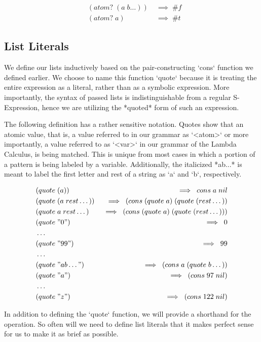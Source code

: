 \begin{align*}
& (atom? \; (a \; b\dots)) \; &\implies \; \#f
\\& (atom? \; a) \; &\implies \; \#t
\end{align*}

\subsection{List Literals}
We define our lists inductively based on the pair-constructing `cons` function we 
defined earlier. We choose to name this function `quote` because it is treating 
the entire expression as a literal, rather than as a symbolic expression. More 
importantly, the syntax of passed lists is indistinguishable from a regular 
S-Expression, hence we are utilizing the *quoted* form of such an expression.

The following definition has a rather sensitive notation. Quotes show that an 
atomic value, that is, a value referred to in our grammar as `<atom>` or more 
importantly, a value referred to as `<var>` in our grammar of the Lambda Calculus, 
is being matched. This is unique from most cases in which a portion of a pattern 
is being labeled by a variable. Additionally, the italicized *ab...* is meant to 
label the first letter and rest of a string as `a` and `b`, respectively.

\begin{align*}
& (quote \; (a)) \; &\implies \; cons \; a \; nil
\\& (quote \; (a \; rest\dots)) \; &\implies \; (cons \; (quote \; a) \; (quote \; (rest\dots))
\\& (quote \; a \; rest\dots) \; &\implies \; (cons \; (quote \; a) \; (quote \; (rest\dots)))
\\& (quote \; "0") \; &\implies \; 0
\\& \dots
\\& (quote \; "99") \; &\implies \; 99
\\& \dots
\\& (quote \; "ab\dots") \; &\implies \; (cons \; a \; (quote \; b\dots))
\\& (quote \; "a") \; &\implies \; (cons \; 97 \; nil)
\\& \dots
\\& (quote \; "z") \; &\implies \; (cons \; 122 \; nil)
\end{align*}

In addition to defining the `quote` function, we will provide a shorthand for the 
operation. So often will we need to define list literals that it makes perfect 
sense for us to make it as brief as possible.

